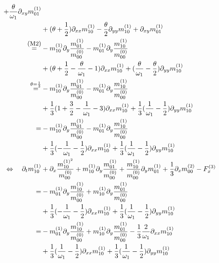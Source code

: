 \documentclass{article}
\begin{document}
\begin{align*}
    + \frac{\theta}{\omega_1}\partial_{xy} m_{01}^{(1)}
    \\ &
    + (\theta + \frac{1}{2}) \partial_{xx} m_{10}^{(1)}
    - \frac{\theta}{2}\partial_{yy} m_{10}^{(1)}
    + \partial_{xy} m_{01}^{(1)}
    \\ \overset{\text{\small(M2)}}{=} &
    -m_{10}^{(1)}\partial_y \frac{ m_{01}^{(1)}}{m_{00}^{(0)}}
    -m_{01}^{(1)}\partial_y \frac{ m_{10}^{(1)}}{m_{00}^{(0)}}
    \\ &
    + (\theta + \frac{1}{2} - \frac{\theta}{\omega_1} - 1) \partial_{xx} m_{10}^{(1)}
    + (\frac{\theta}{\omega_1}-\frac{\theta}{2})\partial_{yy} m_{10}^{(1)}
    \\ \overset{\theta=\frac{1}{3}}{=} &
    -m_{10}^{(1)}\partial_y \frac{ m_{01}^{(1)}}{m_{00}^{(0)}}
    -m_{01}^{(1)}\partial_y \frac{ m_{10}^{(1)}}{m_{00}^{(0)}}
    \\ &
    + \frac{1}{3}(1 + \frac{3}{2} - \frac{1}{\omega_1} - 3) \partial_{xx} m_{10}^{(1)}
    + \frac{1}{3}(\frac{1}{\omega_1}-\frac{1}{2})\partial_{yy} m_{10}^{(1)}
    \\ = &
    -m_{10}^{(1)}\partial_y \frac{ m_{01}^{(1)}}{m_{00}^{(0)}}
    -m_{01}^{(1)}\partial_y \frac{ m_{10}^{(1)}}{m_{00}^{(0)}}
    \\ &
    + \frac{1}{3}(- \frac{1}{\omega_1} - \frac{1}{2}) \partial_{xx} m_{10}^{(1)}
    + \frac{1}{3}(\frac{1}{\omega_1}-\frac{1}{2})\partial_{yy} m_{10}^{(1)}
    \\\Leftrightarrow\quad   \partial_t m_{10}^{(1)} &
    + \partial_x \frac{ m_{10}^{{(1)}^2}}{ m_{00}^{(0)}}
    + m_{10}^{(1)}\partial_y \frac{ m_{01}^{(1)}}{m_{00}^{(0)}}
    + \frac{ m_{10}^{(1)}}{m_{00}^{(0)}}\partial_y m_{01}^{(1)}
    + \frac{1}{3}\partial_x m_{00}^{(2)}
    - F_x^{(3)}
    \\ = &
    - m_{01}^{(1)}\partial_y \frac{ m_{10}^{(1)}}{m_{00}^{(0)}}
    + m_{10}^{(1)}\partial_y \frac{ m_{01}^{(1)}}{m_{00}^{(0)}}
    \\ &
    + \frac{1}{3}(- \frac{1}{\omega_1} - \frac{1}{2}) \partial_{xx} m_{10}^{(1)}
    + \frac{1}{3}(\frac{1}{\omega_1}-\frac{1}{2})\partial_{yy} m_{10}^{(1)}
    \\ = &
    - m_{01}^{(1)}\partial_y \frac{ m_{10}^{(1)}}{m_{00}^{(0)}}
    + m_{10}^{(1)}\partial_y \frac{ m_{01}^{(1)}}{m_{00}^{(0)}}
    - \frac{1}{3}\frac{2}{\omega_1} \partial_{xx} m_{10}^{(1)}
    \\ &
    + \frac{1}{3}(\frac{1}{\omega_1} - \frac{1}{2}) \partial_{xx} m_{10}^{(1)}
    + \frac{1}{3}(\frac{1}{\omega_1} - \frac{1}{2})\partial_{yy} m_{10}^{(1)}

\end{align*}
\end{document}
